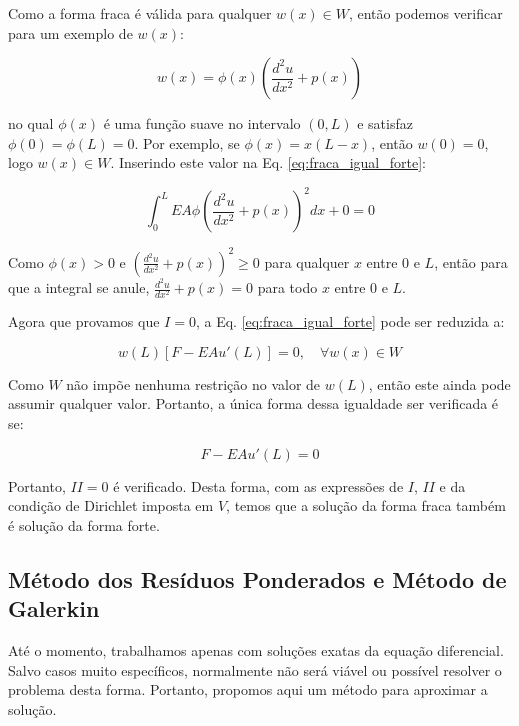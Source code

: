         Como a forma fraca é válida para qualquer $w(x) \in W$, então podemos verificar para um exemplo de $w(x)$:

        \begin{equation*}
            w(x) = \phi(x)\left(\frac{d^2u}{dx^2} + p(x)\right)
        \end{equation*}

        \noindent no qual $\phi(x)$ é uma função suave no intervalo $(0,L)$ e satisfaz $\phi(0) = \phi(L) = 0$. Por exemplo, se $\phi(x) = x(L-x)$, então $w(0) = 0$, logo $w(x) \in W$. Inserindo este valor na Eq. \eqref{eq:fraca_igual_forte}:

        \begin{equation*}
            \int_0^L EA \phi\left(\frac{d^2u}{dx^2} + p(x)\right)^2 dx + 0 = 0
        \end{equation*}

        Como $\phi(x) >0$ e $\left(\frac{d^2u}{dx^2} + p(x)\right)^2 \geq 0$ para qualquer $x$ entre $0$ e $L$, então para que a integral se anule, $\frac{d^2u}{dx^2} + p(x) = 0$ para todo $x$ entre $0$ e $L$.

        Agora que provamos que $I=0$, a Eq. \eqref{eq:fraca_igual_forte} pode ser reduzida a:

        \begin{equation*}
           w(L)\left[F - EAu'(L) \right] = 0 , \quad \forall w(x) \in W
        \end{equation*}

        Como $W$ não impõe nenhuma restrição no valor de $w(L)$, então este ainda pode assumir qualquer valor. Portanto, a única forma dessa igualdade ser verificada é se:

        \begin{equation*}
            F - EAu'(L) = 0 
        \end{equation*}

        Portanto, $II = 0$ é verificado. Desta forma, com as expressões de $I$, $II$ e da condição de Dirichlet imposta em $V$, temos que a solução da forma fraca também é solução da forma forte.



    \subsection{Método dos Resíduos Ponderados e Método de Galerkin}

        Até o momento, trabalhamos apenas com soluções exatas da equação diferencial. Salvo casos muito específicos, normalmente não será viável ou possível resolver o problema desta forma. Portanto, propomos aqui um método para aproximar a solução.

